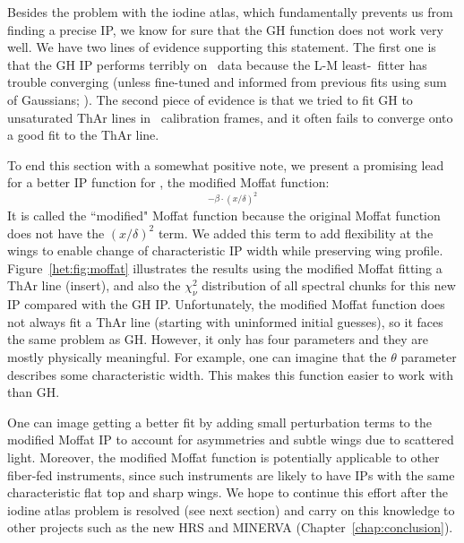 Besides the problem with the iodine atlas, which fundamentally
prevents us from finding a precise IP, we know for sure that the GH
function does not work very well. We have two lines of evidence
supporting this statement. The first one is that the GH IP performs
terribly on \keck\ data because the L-M least-\chisq\ fitter has
trouble converging (unless fine-tuned and informed from previous fits
using sum of Gaussians; \citealt{2013AAS...22114908V}). The second
piece of evidence is that we tried to fit GH to unsaturated ThAr lines
in \het\ calibration frames, and it often fails to converge onto a
good fit to the ThAr line. 

To end this section with a somewhat positive note, we present a
promising lead for a better IP function for \hrs, the modified Moffat
function:
\begin{equation}
[1+(x/\theta)^2]^{-\beta\cdot(x/\delta)^2}
\end{equation} 
It is called the ``modified" Moffat function because the original
Moffat function does not have the $(x/\delta)^2$ term. We added this
term to add flexibility at the wings to enable change of
characteristic IP width while preserving wing
profile. Figure~\ref{het:fig:moffat} illustrates the results using the
modified Moffat fitting a ThAr line (insert), and also the
$\chi^2_\nu$ distribution of all spectral chunks for this new IP
compared with the GH IP. Unfortunately, the modified Moffat function
does not always fit a ThAr line (starting with uninformed initial
guesses), so it faces the same problem as GH. However, it only has
four parameters and they are mostly physically meaningful. For
example, one can imagine that the $\theta$ parameter describes some
characteristic width. This makes this function easier to work with than
GH.

One can image getting a better fit by adding small perturbation terms
to the modified Moffat IP to account for asymmetries and subtle wings
due to scattered light. Moreover, the modified Moffat function is
potentially applicable to other fiber-fed instruments, since such
instruments are likely to have IPs with the same characteristic flat
top and sharp wings. We hope to continue this effort after the iodine
atlas problem is resolved (see next section) and carry on this
knowledge to other projects such as the new HRS and MINERVA
(Chapter~\ref{chap:conclusion}).


